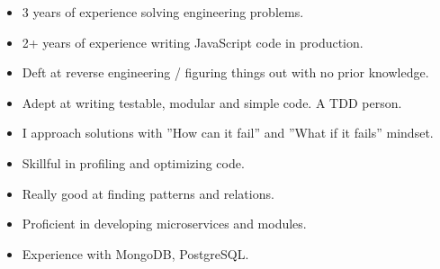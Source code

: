 





\smallskip
\begin{itemize}
\item 3 years of experience solving engineering problems.
\item 2+ years of experience writing JavaScript code in production.
\item Deft at reverse engineering / figuring things out with no prior knowledge.
\item Adept at writing testable, modular and simple code. A TDD person.
\item I approach solutions with ”How can it fail” and ”What if it fails” mindset.
\item Skillful in profiling and optimizing code.
\item Really good at finding patterns and relations.
\item Proficient in developing microservices and modules.
\item Experience with MongoDB, PostgreSQL.
\end{itemize}



